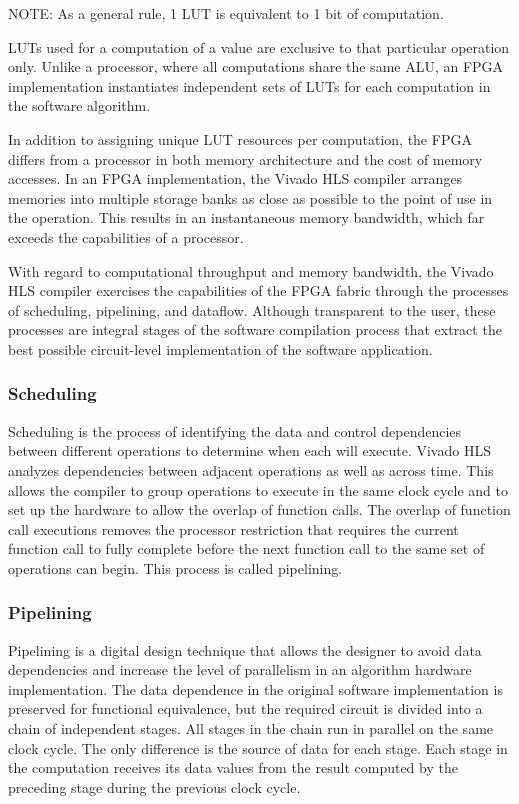 \begin{highlight}
  NOTE: As a general rule, 1 LUT is equivalent to 1 bit of computation.
\end{highlight}

LUTs used for a computation of a value are exclusive to that particular operation only. Unlike a
processor, where all computations share the same ALU, an FPGA implementation
instantiates independent sets of LUTs for each computation in the software algorithm. 

\par In addition to assigning unique LUT resources per computation, the FPGA differs from a
processor in both memory architecture and the cost of memory accesses. In an FPGA
implementation, the Vivado HLS compiler arranges memories into multiple storage banks
as close as possible to the point of use in the operation. This results in an instantaneous
memory bandwidth, which far exceeds the capabilities of a processor. 

\par With regard to computational throughput and memory bandwidth, the Vivado HLS
compiler exercises the capabilities of the FPGA fabric through the processes of scheduling,
pipelining, and dataflow. Although transparent to the user, these processes are integral
stages of the software compilation process that extract the best possible circuit-level
implementation of the software application.

\subsubsection{Scheduling}
Scheduling is the process of identifying the data and control dependencies between
different operations to determine when each will execute. Vivado HLS analyzes dependencies between adjacent operations as well as across time. This
allows the compiler to group operations to execute in the same clock cycle and to set up the
hardware to allow the overlap of function calls. The overlap of function call executions
removes the processor restriction that requires the current function call to fully complete
before the next function call to the same set of operations can begin. This process is called
pipelining.

\subsubsection{Pipelining}
Pipelining is a digital design technique that allows the designer to avoid data dependencies
and increase the level of parallelism in an algorithm hardware implementation. The data
dependence in the original software implementation is preserved for functional
equivalence, but the required circuit is divided into a chain of independent stages. All
stages in the chain run in parallel on the same clock cycle. The only difference is the source
of data for each stage. Each stage in the computation receives its data values from the result
computed by the preceding stage during the previous clock cycle. 

